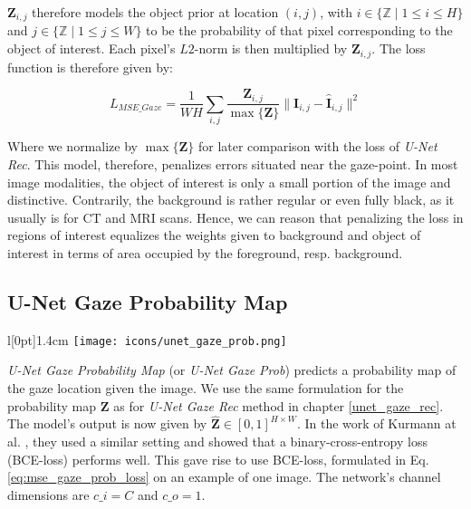 $\boldsymbol{Z}_{i,j}$ therefore models the object prior at location $(i,j)$, with $i \in \{\mathbb{Z} \mid 1 \leq i \leq H\}$ and $j \in \{\mathbb{Z} \mid 1 \leq j \leq W\}$ to be the probability of that pixel corresponding to the object of interest. Each pixel's $L2$-norm is then multiplied by $\boldsymbol{Z}_{i,j}$. The loss function is therefore given by:

\begin{equation}
L_{MSE\_Gaze} = \frac{1}{W H} \sum_{i,j} \frac{\boldsymbol{Z}_{i,j}}{\max{\{\boldsymbol{Z}\}}} \|\boldsymbol{I}_{i,j} - \boldsymbol{\hat{I}}_{i,j}\|^2
\label{eq:mse_gaze_loss}
\end{equation}
\hspace{6pt}

Where we normalize by $\max{\{\boldsymbol{Z}\}}$ for later comparison with the loss of \textit{U-Net Rec}. This model, therefore, penalizes errors situated near the gaze-point. In most image modalities, the object of interest is only a small portion of the image and distinctive. Contrarily, the background is rather regular or even fully black, as it usually is for CT and MRI scans. Hence, we can reason that penalizing the loss in regions of interest equalizes the weights given to background and object of interest in terms of area occupied by the foreground, resp. background.

\subsection{U-Net Gaze Probability Map} \label{unet_gaze_prob_map}
\begingroup
\setlength\intextsep{0pt}
\begin{wrapfigure}[4]{l}[0pt]{1.4cm}
\texttt{[image: icons/unet\_gaze\_prob.png]}
\end{wrapfigure}

\textit{U-Net Gaze Probability Map} (or \textit{U-Net Gaze Prob}) predicts a probability map of the gaze location given the image. We use the same formulation for the probability map $\boldsymbol{Z}$ as for \textit{U-Net Gaze Rec} method in chapter \ref{unet_gaze_rec}. The model's output is now given by $\boldsymbol{\hat{Z}} \in [0,1]^{H \times W}$. In the work of Kurmann at al. \cite{kurmann17}, they used a similar setting and showed that a binary-cross-entropy loss (BCE-loss) performs well. This gave rise to use BCE-loss, formulated in Eq. \ref{eq:mse_gaze_prob_loss} on an example of one image. The network's channel dimensions are $c\_i=C$ and $c\_o=1$.

